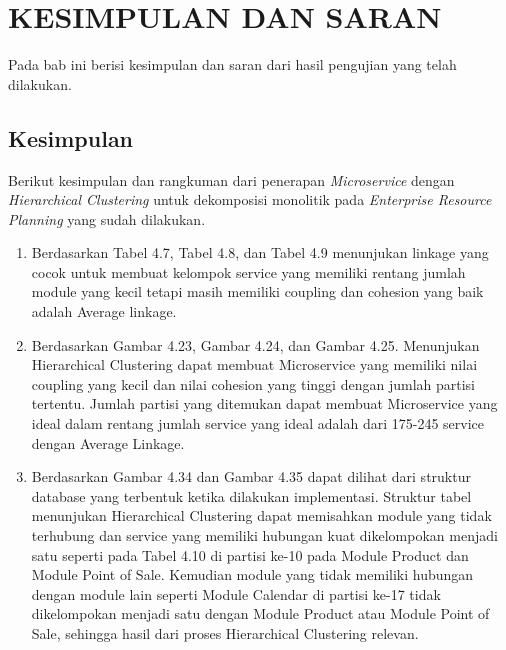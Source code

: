\chapter{KESIMPULAN DAN SARAN}

\vspace{4.5pt}
Pada bab ini berisi kesimpulan dan saran dari hasil pengujian yang telah dilakukan.  


\section{Kesimpulan}
Berikut kesimpulan dan rangkuman dari penerapan \textit{Microservice} dengan \textit{Hierarchical Clustering} untuk dekomposisi monolitik pada \textit{Enterprise Resource Planning} yang sudah dilakukan.

\begin{enumerate}[nolistsep,leftmargin=0.5cm]
    \item Berdasarkan Tabel 4.7,  Tabel 4.8, dan Tabel 4.9 menunjukan linkage yang cocok untuk membuat kelompok service yang memiliki rentang jumlah module yang kecil tetapi masih memiliki coupling dan cohesion yang baik adalah Average linkage.
    \item Berdasarkan Gambar 4.23, Gambar 4.24,  dan Gambar 4.25. Menunjukan Hierarchical Clustering dapat membuat Microservice yang memiliki nilai coupling yang kecil dan nilai cohesion yang tinggi dengan jumlah partisi tertentu. Jumlah partisi yang ditemukan dapat membuat Microservice yang ideal dalam rentang jumlah service yang ideal adalah dari 175-245 service dengan Average Linkage. 
    \item Berdasarkan Gambar 4.34  dan Gambar 4.35 dapat dilihat dari struktur database yang terbentuk ketika dilakukan implementasi. Struktur tabel menunjukan Hierarchical Clustering dapat memisahkan module yang tidak terhubung dan service yang memiliki hubungan kuat dikelompokan menjadi satu seperti pada Tabel 4.10 di partisi ke-10 pada Module Product dan Module Point of Sale. Kemudian module yang tidak memiliki hubungan dengan module lain seperti Module Calendar di partisi ke-17 tidak dikelompokan menjadi satu dengan Module Product atau Module Point of Sale, sehingga hasil dari proses Hierarchical Clustering relevan.\\
\end{enumerate}

